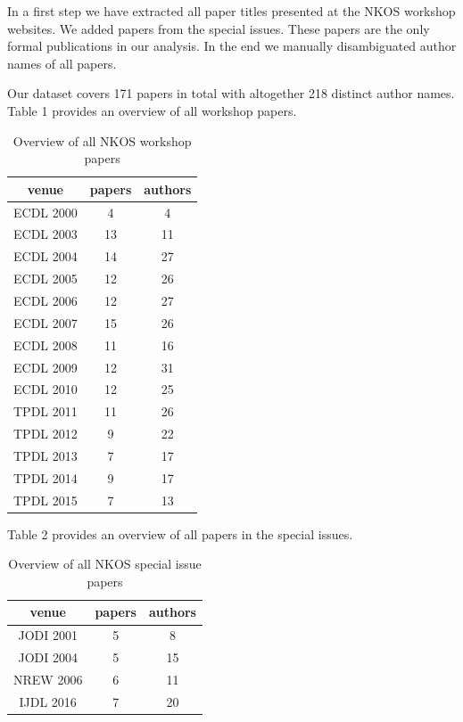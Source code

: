 \documentclass[runningheads,a4paper]{llncs}
\begin{document}
In a first step we have extracted all paper titles presented at the NKOS workshop websites. We added papers from the special issues. These papers are the only formal publications in our analysis.  In the end we manually disambiguated author names of all papers.

Our dataset covers 171 papers in total with altogether 218 distinct author names. Table 1 provides an overview of all workshop papers. 

\begin{table}
	\centering
	\caption{Overview of all NKOS workshop papers}
\begin{tabular}	{|c|c|c|}		
	\hline 
	venue& papers  & authors  \\ 
	\hline 
	ECDL 2000& 4 & 4 \\ 
	\hline 
	ECDL 2003& 13 & 11 \\ 
	\hline 
	ECDL 2004& 14 & 27 \\ 
	\hline 
	ECDL 2005& 12 & 26 \\ 
	\hline 
	ECDL 2006& 12 & 27 \\ 
	\hline 
	ECDL 2007& 15 & 26 \\ 
	\hline 
	ECDL 2008& 11 & 16 \\ 
	\hline 
	ECDL 2009& 12 & 31 \\ 
	\hline 
	ECDL 2010& 12 & 25 \\ 
	\hline 
	TPDL 2011& 11 & 26 \\ 
	\hline 
	TPDL 2012& 9 & 22 \\ 
	\hline 
	TPDL 2013& 7 & 17 \\ 
	\hline 
	TPDL 2014& 9 & 17 \\ 
	\hline 
	TPDL 2015& 7 & 13 \\ 
	\hline 
\end{tabular} 
\label{tab:workshops}
\end{table}


Table 2 provides an overview of all papers in the special issues. 

\begin{table}
	\centering
	\caption{Overview of all NKOS special issue papers}
\begin{tabular}{|c|c|c|}  
	\hline 
	venue& papers  & authors  \\ 
	\hline 
	JODI 2001 \cite{Hill2001} & 5 & 8 \\ 
	\hline 
	JODI 2004 \cite{Tudhope2004} & 5 & 15 \\ 
	\hline 
	NREW 2006 \cite{Tudhope2006} & 6 & 11 \\ 
	\hline 
	IJDL 2016 \cite{Mayr2016} & 7 &  20\\ 
	\hline 
\end{tabular} 
\label{tab:SI}
\end{table}
\end{document}
